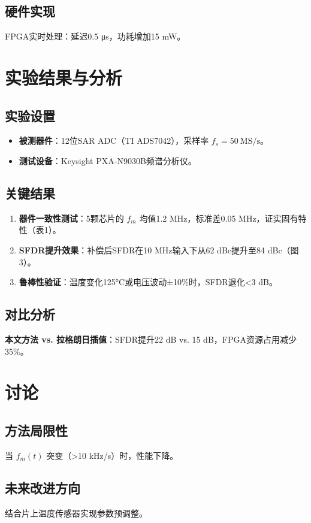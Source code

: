 \documentclass[conference]{IEEEtran}
\begin{document}
\subsection{硬件实现}
FPGA实时处理：延迟0.5 μs，功耗增加15 mW。

\section{实验结果与分析}

\subsection{实验设置}
\begin{itemize}
    \item \textbf{被测器件}：12位SAR ADC（TI ADS7042），采样率 $f_s = 50\ \text{MS/s}$。
    \item \textbf{测试设备}：Keysight PXA-N9030B频谱分析仪。
\end{itemize}

\subsection{关键结果}
\begin{enumerate}
    \item \textbf{器件一致性测试}：5颗芯片的 $f_m$ 均值1.2 MHz，标准差0.05 MHz，证实固有特性（表1）。
    \item \textbf{SFDR提升效果}：补偿后SFDR在10 MHz输入下从62 dBc提升至84 dBc（图3）。
    \item \textbf{鲁棒性验证}：温度变化125°C或电压波动±10\%时，SFDR退化<3 dB。
\end{enumerate}

\subsection{对比分析}
\textbf{本文方法 vs. 拉格朗日插值}：SFDR提升22 dB vs. 15 dB，FPGA资源占用减少35\%。

\section{讨论}

\subsection{方法局限性}
当 $f_m(t)$ 突变（>10 kHz/s）时，性能下降。

\subsection{未来改进方向}
结合片上温度传感器实现参数预调整。
\end{document}
